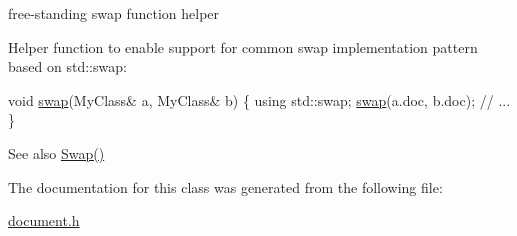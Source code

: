 free-\/standing swap function helper 

Helper function to enable support for common swap implementation pattern based on {\ttfamily std\+::swap\+:} 
\begin{DoxyCode}
\textcolor{keywordtype}{void} \hyperlink{a01996_a0d63efcc43758ac3aed77e868233369d}{swap}(MyClass& a, MyClass& b) \{
    \textcolor{keyword}{using} std::swap;
    \hyperlink{a01996_a0d63efcc43758ac3aed77e868233369d}{swap}(a.doc, b.doc);
    \textcolor{comment}{// ...}
\}
\end{DoxyCode}
 \begin{DoxySeeAlso}{See also}
\hyperlink{a01996_a6290e1290fad74177625af5938c0c58f}{Swap()} 
\end{DoxySeeAlso}


The documentation for this class was generated from the following file\+:\begin{DoxyCompactItemize}
\item 
\hyperlink{a00476}{document.\+h}\end{DoxyCompactItemize}
